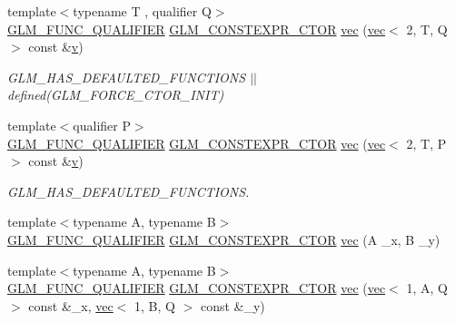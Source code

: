 \begin{DoxyCompactItemize}
\item 
{\footnotesize template$<$typename T , qualifier Q$>$ }\\\mbox{\hyperlink{setup_8hpp_a33fdea6f91c5f834105f7415e2a64407}{G\+L\+M\+\_\+\+F\+U\+N\+C\+\_\+\+Q\+U\+A\+L\+I\+F\+I\+ER}} \mbox{\hyperlink{setup_8hpp_ad34178a09666081abdb573c14d1f4a5a}{G\+L\+M\+\_\+\+C\+O\+N\+S\+T\+E\+X\+P\+R\+\_\+\+C\+T\+OR}} \mbox{\hyperlink{structglm_1_1vec_3_012_00_01_t_00_01_q_01_4_a1dc70d40254a106cf1589d2fb91cadf8}{vec}} (\mbox{\hyperlink{structglm_1_1vec}{vec}}$<$ 2, T, Q $>$ const \&\mbox{\hyperlink{_s_d_l__opengl_8h_a10a82eabcb59d2fcd74acee063775f90}{v}})
\begin{DoxyCompactList}\small\item\em G\+L\+M\+\_\+\+H\+A\+S\+\_\+\+D\+E\+F\+A\+U\+L\+T\+E\+D\+\_\+\+F\+U\+N\+C\+T\+I\+O\+NS $\vert$$\vert$ defined(\+G\+L\+M\+\_\+\+F\+O\+R\+C\+E\+\_\+\+C\+T\+O\+R\+\_\+\+I\+N\+I\+T) \end{DoxyCompactList}\item 
{\footnotesize template$<$qualifier P$>$ }\\\mbox{\hyperlink{setup_8hpp_a33fdea6f91c5f834105f7415e2a64407}{G\+L\+M\+\_\+\+F\+U\+N\+C\+\_\+\+Q\+U\+A\+L\+I\+F\+I\+ER}} \mbox{\hyperlink{setup_8hpp_ad34178a09666081abdb573c14d1f4a5a}{G\+L\+M\+\_\+\+C\+O\+N\+S\+T\+E\+X\+P\+R\+\_\+\+C\+T\+OR}} \mbox{\hyperlink{structglm_1_1vec_3_012_00_01_t_00_01_q_01_4_a207754db3db8bcf1251e3b46a1e2c58c}{vec}} (\mbox{\hyperlink{structglm_1_1vec}{vec}}$<$ 2, T, P $>$ const \&\mbox{\hyperlink{_s_d_l__opengl_8h_a10a82eabcb59d2fcd74acee063775f90}{v}})
\begin{DoxyCompactList}\small\item\em G\+L\+M\+\_\+\+H\+A\+S\+\_\+\+D\+E\+F\+A\+U\+L\+T\+E\+D\+\_\+\+F\+U\+N\+C\+T\+I\+O\+NS. \end{DoxyCompactList}\item 
{\footnotesize template$<$typename A, typename B$>$ }\\\mbox{\hyperlink{setup_8hpp_a33fdea6f91c5f834105f7415e2a64407}{G\+L\+M\+\_\+\+F\+U\+N\+C\+\_\+\+Q\+U\+A\+L\+I\+F\+I\+ER}} \mbox{\hyperlink{setup_8hpp_ad34178a09666081abdb573c14d1f4a5a}{G\+L\+M\+\_\+\+C\+O\+N\+S\+T\+E\+X\+P\+R\+\_\+\+C\+T\+OR}} \mbox{\hyperlink{structglm_1_1vec_3_012_00_01_t_00_01_q_01_4_a161096cd80858035c7375517507e97c4}{vec}} (A \+\_\+x, B \+\_\+y)
\item 
{\footnotesize template$<$typename A, typename B$>$ }\\\mbox{\hyperlink{setup_8hpp_a33fdea6f91c5f834105f7415e2a64407}{G\+L\+M\+\_\+\+F\+U\+N\+C\+\_\+\+Q\+U\+A\+L\+I\+F\+I\+ER}} \mbox{\hyperlink{setup_8hpp_ad34178a09666081abdb573c14d1f4a5a}{G\+L\+M\+\_\+\+C\+O\+N\+S\+T\+E\+X\+P\+R\+\_\+\+C\+T\+OR}} \mbox{\hyperlink{structglm_1_1vec_3_012_00_01_t_00_01_q_01_4_a2801c2c65b9d873d5d5008688f7339a6}{vec}} (\mbox{\hyperlink{structglm_1_1vec}{vec}}$<$ 1, A, Q $>$ const \&\+\_\+x, \mbox{\hyperlink{structglm_1_1vec}{vec}}$<$ 1, B, Q $>$ const \&\+\_\+y)

\end{DoxyCompactItemize}
